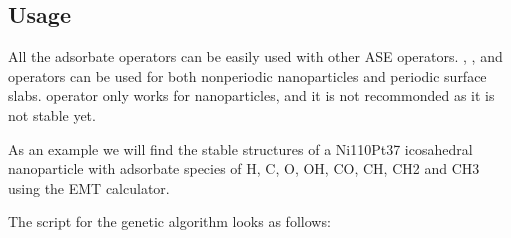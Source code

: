 \documentclass[letterpaper,10pt,english]{sphinxmanual}
\begin{document}
\subsection{Usage}
\label{\detokenize{ga:usage}}
All the adsorbate operators can be easily used with other ASE operators. , ,  and  operators can be used for both non\sphinxhyphen{}periodic nanoparticles and periodic surface slabs.  operator only works for nanoparticles, and it is not recommonded as it is not stable yet.

As an example we will find the stable structures of a Ni110Pt37 icosahedral nanoparticle with adsorbate species of H, C, O, OH, CO, CH, CH2 and CH3 using the EMT calculator.

The script for the genetic algorithm looks as follows:
\end{document}
